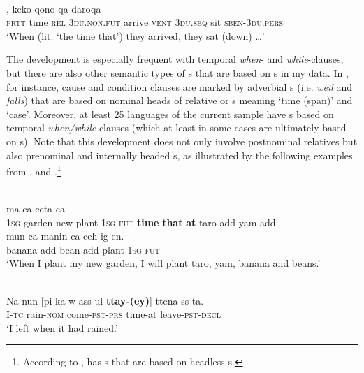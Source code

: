 \documentclass[output=paper]{langsci/langscibook}
\begin{document}
\ea\label{ex:diessel:11}
\\
,  keko  qono  qa-daroqa\\
        \textsc{prtt}   time  \textsc{rel}   3\textsc{du.non.fut}  arrive  \textsc{vent}  \textsc{3du.seq}  sit  \textsc{sben-3du.pers}\\
\glt   `When (lit. `the time that’) they arrived, they sat (down) …'
\z

The development is especially frequent with temporal \textit{when}- and \textit{while}-clauses, but there are also other semantic types of s that are based on s in my data. In , for instance, cause and condition clauses are marked by adverbial s (i.e. \textit{weil} and \textit{falls}) that are based on nominal heads of relative or s meaning ‘time (span)’ and ‘case’. Moreover, at least 25 languages of the current sample have s based on temporal \textit{when/while}-clauses (which at least in some cases are ultimately based on s). Note that this development does not only involve postnominal relatives but also prenominal and internally headed s, as illustrated by the following examples from  ,   and  .\footnote{According to \citet{Epps2009_RC},  has s that are based on headless s.} 

\ea\label{ex:diessel:12}
\\
   ma   ca  ceta  ca\\
        1\textsc{sg}   garden   new   plant-1\textsc{sg-fut}   \textbf{time}   \textbf{that}    \textbf{at}   taro   add  yam  add  \\
\gll   mun    ca    manin    ca  ceh-ig-en.\\
       banana   add bean    add  plant-\textsc{1sg-fut}\\
\glt `When I plant my new garden, I will plant taro, yam, banana and beans.'
\z

\ea\label{ex:diessel:13}
\\
\gll   Na-nun  [pi-ka  w-ass-ul   \textbf{ttay-(ey)}]    ttena-ss-ta.\\
       I-\textsc{tc}  rain-\textsc{nom}  come-\textsc{pst-prs}  time-at     leave-\textsc{pst-decl}\\
\glt   `I left when it had rained.' 
\z
\end{document}
